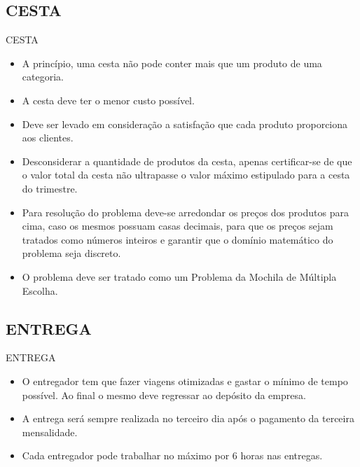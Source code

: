 \documentclass[	english,			%
	brazil,]{beamer}
\begin{document}
\subsection{CESTA}

\begin{frame}{CESTA}

\begin{itemize}
	
\item A princípio, uma cesta não pode conter mais que um produto de uma categoria.
\item A cesta deve ter o menor custo possível.
\item Deve ser levado em consideração a satisfação que cada produto proporciona aos clientes.
\item Desconsiderar a quantidade de produtos da cesta, apenas certificar-se de que o valor total da cesta não ultrapasse o valor máximo estipulado para a cesta do trimestre.
\item Para resolução do problema deve-se arredondar os preços dos produtos para cima, caso os mesmos possuam casas decimais, para que os preços sejam tratados como números inteiros e garantir que o domínio matemático do problema seja discreto.
\item O problema deve ser tratado como um Problema da Mochila de Múltipla Escolha.
\end{itemize}

\end{frame}

\subsection{ENTREGA}

\begin{frame}{ENTREGA}
\begin{itemize}
\item O entregador tem que fazer viagens otimizadas e gastar o mínimo de tempo possível. Ao final o mesmo deve regressar ao depósito da empresa.
\item A entrega será sempre realizada no terceiro dia após o pagamento da terceira mensalidade.
\item Cada entregador pode trabalhar no máximo por 6 horas nas entregas.
\end{itemize}
\end{frame}
\end{document}
